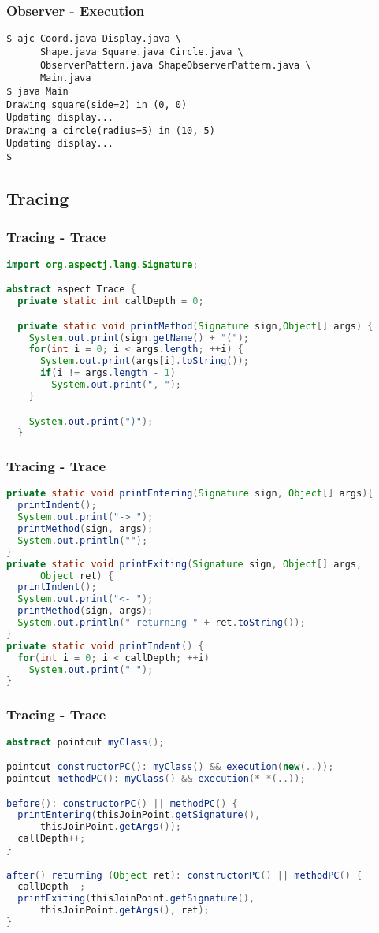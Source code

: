 \documentclass[11pt]{beamer}
\begin{document}
\begin{frame}[fragile]
   \frametitle{Observer - Execution}
   {\scriptsize
\begin{lstlisting}
$ ajc Coord.java Display.java \
      Shape.java Square.java Circle.java \
      ObserverPattern.java ShapeObserverPattern.java \
      Main.java
$ java Main
Drawing square(side=2) in (0, 0)
Updating display...
Drawing a circle(radius=5) in (10, 5)
Updating display...
$
\end{lstlisting}
   }
\end{frame}

\subsection*{Tracing}
\begin{frame}[fragile]
   \frametitle{Tracing - Trace}
   {\scriptsize
   \begin{lstlisting}[language=java]
import org.aspectj.lang.Signature;

abstract aspect Trace {
  private static int callDepth = 0;

  private static void printMethod(Signature sign,Object[] args) {
    System.out.print(sign.getName() + "(");
    for(int i = 0; i < args.length; ++i) {
      System.out.print(args[i].toString());
      if(i != args.length - 1)
        System.out.print(", ");
    }

    System.out.print(")");
  }
   \end{lstlisting}}
\end{frame}

\begin{frame}[fragile]
   \frametitle{Tracing - Trace}
   {\scriptsize
   \begin{lstlisting}[language=java]
private static void printEntering(Signature sign, Object[] args){
  printIndent();
  System.out.print("-> ");
  printMethod(sign, args);
  System.out.println("");
}
private static void printExiting(Signature sign, Object[] args,
      Object ret) {
  printIndent();
  System.out.print("<- ");
  printMethod(sign, args);
  System.out.println(" returning " + ret.toString());
}
private static void printIndent() {
  for(int i = 0; i < callDepth; ++i)
    System.out.print(" ");
}
   \end{lstlisting}}
\end{frame}

\begin{frame}[fragile]
   \frametitle{Tracing - Trace}
   {\scriptsize
   \begin{lstlisting}[language=java]
abstract pointcut myClass();

pointcut constructorPC(): myClass() && execution(new(..));
pointcut methodPC(): myClass() && execution(* *(..));

before(): constructorPC() || methodPC() {
  printEntering(thisJoinPoint.getSignature(),
      thisJoinPoint.getArgs());
  callDepth++;
}

after() returning (Object ret): constructorPC() || methodPC() {
  callDepth--;
  printExiting(thisJoinPoint.getSignature(),
      thisJoinPoint.getArgs(), ret);
}
   \end{lstlisting}}
\end{frame}
\end{document}
